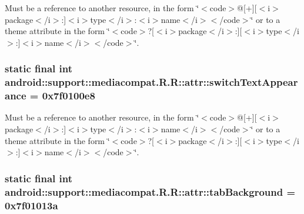 Must be a reference to another resource, in the form \char`\"{}$<$code$>$@\mbox{[}+\mbox{]}\mbox{[}$<$i$>$package$<$/i$>$:\mbox{]}$<$i$>$type$<$/i$>$:$<$i$>$name$<$/i$>$$<$/code$>$\char`\"{} or to a theme attribute in the form \char`\"{}$<$code$>$?\mbox{[}$<$i$>$package$<$/i$>$:\mbox{]}\mbox{[}$<$i$>$type$<$/i$>$:\mbox{]}$<$i$>$name$<$/i$>$$<$/code$>$\char`\"{}. \hypertarget{classandroid_1_1support_1_1mediacompat_1_1_r_1_1attr_4e1699c64be5076728b3035cb2e7f6c9}{
\subsubsection[{switchTextAppearance}]{\setlength{\rightskip}{0pt plus 5cm}static final int android::support::mediacompat.R.R::attr::switchTextAppearance = 0x7f0100e8}}
\label{classandroid_1_1support_1_1mediacompat_1_1_r_1_1attr_4e1699c64be5076728b3035cb2e7f6c9}


Must be a reference to another resource, in the form \char`\"{}$<$code$>$@\mbox{[}+\mbox{]}\mbox{[}$<$i$>$package$<$/i$>$:\mbox{]}$<$i$>$type$<$/i$>$:$<$i$>$name$<$/i$>$$<$/code$>$\char`\"{} or to a theme attribute in the form \char`\"{}$<$code$>$?\mbox{[}$<$i$>$package$<$/i$>$:\mbox{]}\mbox{[}$<$i$>$type$<$/i$>$:\mbox{]}$<$i$>$name$<$/i$>$$<$/code$>$\char`\"{}. \hypertarget{classandroid_1_1support_1_1mediacompat_1_1_r_1_1attr_15458c222ba66c7b0f4e8939cac9bc22}{
\subsubsection[{tabBackground}]{\setlength{\rightskip}{0pt plus 5cm}static final int android::support::mediacompat.R.R::attr::tabBackground = 0x7f01013a}}
\label{classandroid_1_1support_1_1mediacompat_1_1_r_1_1attr_15458c222ba66c7b0f4e8939cac9bc22}


